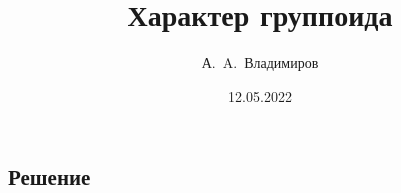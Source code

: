 \documentclass[11pt]{article}
\theoremstyle{plain}
\theoremstyle{definition}
\theoremstyle{remark}
\begin{document}
\author{А.~A.~Владимиров}
\title{Характер группоида}
\date{12.05.2022}
\maketitle



\subsection*{Решение}
            
\newpage    
\newpage    
\newpage    
\newpage    
            
            
\end{document}
